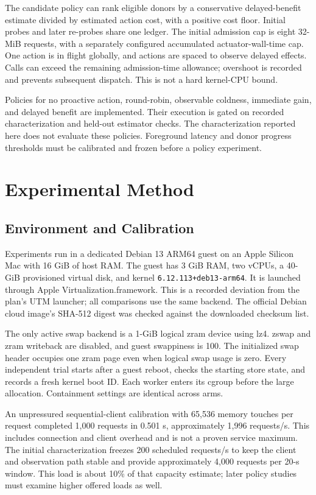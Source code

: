 \documentclass[conference]{IEEEtran}
\begin{document}
The candidate policy can rank eligible donors by a conservative delayed-benefit
estimate divided by estimated action cost, with a positive cost floor. Initial
probes and later re-probes share one ledger. The initial admission cap is eight
32-MiB requests, with a separately configured accumulated actuator-wall-time
cap. One action is in flight globally, and actions are spaced to observe delayed
effects. Calls can exceed the remaining admission-time allowance; overshoot is
recorded and prevents subsequent dispatch. This is not a hard kernel-CPU bound.

Policies for no proactive action, round-robin, observable coldness, immediate
gain, and delayed benefit are implemented. Their execution is gated on recorded
characterization and held-out estimator checks. The characterization reported
here does not evaluate these policies. Foreground latency and donor progress
thresholds must be calibrated and frozen before a policy experiment.

\section{Experimental Method}
\subsection{Environment and Calibration}
Experiments run in a dedicated Debian 13 ARM64 guest on an Apple Silicon Mac
with 16 GiB of host RAM. The guest has 3 GiB RAM, two vCPUs, a 40-GiB provisioned
virtual disk, and kernel \texttt{6.12.113+deb13-arm64}. It is launched through
Apple Virtualization.framework. This is a recorded deviation from the plan's
UTM launcher; all comparisons use the same backend. The official Debian cloud
image's SHA-512 digest was checked against the downloaded checksum list.

The only active swap backend is a 1-GiB logical zram device using lz4. zswap and
zram writeback are disabled, and guest swappiness is 100. The initialized swap
header occupies one zram page even when logical swap usage is zero. Every
independent trial starts after a guest reboot, checks the starting store state,
and records a fresh kernel boot ID. Each worker enters its cgroup before the
large allocation. Containment settings are identical across arms.

An unpressured sequential-client calibration with 65,536 memory touches per
request completed 1,000 requests in 0.501 s, approximately 1,996 requests/s.
This includes connection and client overhead and is not a proven service
maximum. The initial characterization freezes 200 scheduled requests/s to keep
the client and observation path stable and provide approximately 4,000 requests
per 20-s window. This load is about 10\% of that capacity estimate; later policy
studies must examine higher offered loads as well.
\end{document}
